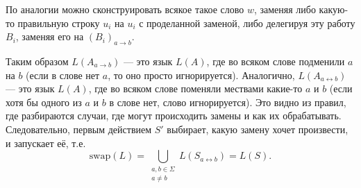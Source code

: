 \documentclass[12pt,a4paper]{article}
\newcommand{\swap}{\mathrm{swap}}
\begin{document}
\begin{problem}{4}
        По аналогии можно сконструировать всякое такое слово $w$, заменяя либо какую-то правильную строку $u_i$ на $u_i$ с проделанной заменой, либо делегируя эту работу $B_i$, заменяя его на $(B_i)_{a \to b}$.

        Таким образом $L(A_{a \to b})$ --- это язык $L(A)$, где во всяком слове подменили $a$ на $b$ (если в слове нет $a$, то оно просто игнорируется). Аналогично, $L(A_{a \leftrightarrow b})$ --- это язык $L(A)$, где во всяком слове поменяли мествами какие-то $a$ и $b$ (если хотя бы одного из $a$ и $b$ в слове нет, слово игнорируется). Это видно из правил, где разбираются случаи, где могут происходить замены и как их обрабатывать. Следовательно, первым действием $S'$ выбирает, какую замену хочет произвести, и запускает её, т.е.
        \[\swap(L) = \bigcup_{\substack{a, b \in \Sigma\\a \neq b}} L(S_{a \leftrightarrow b}) = L(S).\]
    \end{problem}
\end{document}
